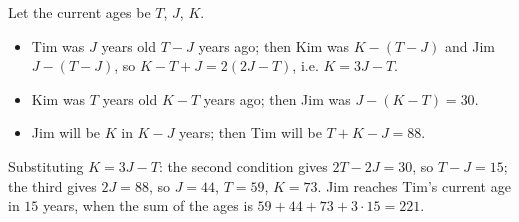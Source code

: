 Let the current ages be $T$, $J$, $K$.
\begin{itemize}
\item Tim was $J$ years old $T-J$ years ago; then Kim was $K-(T-J)$ and Jim $J-(T-J)$, so $K-T+J=2(2J-T)$, i.e. $K=3J-T$.
\item Kim was $T$ years old $K-T$ years ago; then Jim was $J-(K-T)=30$.
\item Jim will be $K$ in $K-J$ years; then Tim will be $T+K-J=88$.
\end{itemize}
Substituting $K=3J-T$: the second condition gives $2T-2J=30$, so $T-J=15$; the third gives $2J=88$, so $J=44$, $T=59$, $K=73$. Jim reaches Tim's current age in $15$ years, when the sum of the ages is $59+44+73+3\cdot15=\boxed{221}$.
